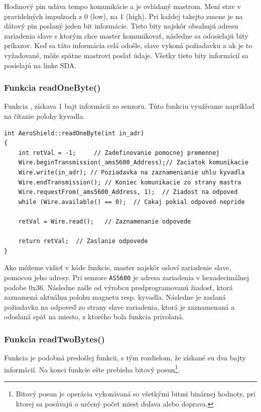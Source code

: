 Hodinový pin udáva tempo komunikácie a je ovládaný mastrom. Mení stav v pravidelných impulzoch z 0 (low), na 1 (high). Pri každej takejto zmene je na dátový pin poslaný jeden bit informácie. Tieto bity najskôr obsahujú adresu zariadenia slave s ktorým chce master komunikovať, následne sa odosielajú bity príkazov. Keď sa táto informácia celá odošle, slave vykoná požiadavku a ak je to vyžadované, môže spätne mastrovi poslať údaje. Všetky tieto bity informácií sa posielajú na linke SDA\cite{idvac}.

   

\subsubsection{Funkcia readOneByte()}

 Funkcia , získava 1 bajt informácii zo senzoru. Túto funkciu využívame napríklad na čítanie polohy kyvadla. 

\begin{lstlisting}[caption={Zdrojový kód funkcie readOneByte.},captionpos=b]
int AeroShield::readOneByte(int in_adr)         
{
	int retVal = -1;	 // Zadefinovanie pomocnej premennej
	Wire.beginTransmission(_ams5600_Address);// Zaciatok komunikacie 
	Wire.write(in_adr);	// Poziadavka na zaznamenianie uhlu kyvadla 
	Wire.endTransmission();	// Koniec komunikacie zo strany mastra
	Wire.requestFrom(_ams5600_Address, 1);	// Ziadost na odpoved  
	while (Wire.available() == 0);	// Cakaj pokial odpoved nepride  
	
	retVal = Wire.read();	// Zaznamenanie odpovede 
	
	return retVal;	// Zaslanie odpovede 
}
\end{lstlisting}

Ako môžeme vidieť v kóde funkcie, master najskôr osloví zariadenie slave, pomocou jeho adresy. Pri senzore \verb|AS5600| je adresa zariadenia v hexadecimálnej podobe 0x36. Následne zašle od výrobcu predprogramovanú žiadosť, ktorá zaznamená aktuálnu polohu magnetu resp. kyvadla. Následne je zaslaná požiadavka na odpoveď zo strany slave zariadenia, ktorá je zaznamenaná a odoslaná späť na miesto, z ktorého bola funkcia privolaná.

\subsubsection{Funkcia readTwoBytes()}

Funkcia  je podobná predošlej funkcii, s tým rozdielom, že získané su dva bajty informácií. Na konci funkcie ešte prebieha bitový posun\footnote[6]{Bitový posun je operácia vykonávaná so všetkými bitmi binárnej hodnoty, pri ktorej sa posúvajú o určený počet miest doľava alebo doprava\cite{biteShift}.}. 

